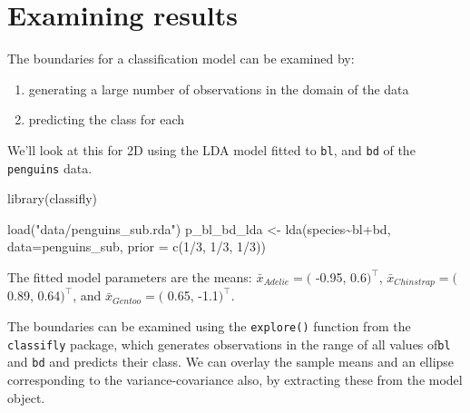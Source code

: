 \documentclass[
  letterpaper,
]{book}
\newenvironment{Shaded}{\begin{snugshade}}{\end{snugshade}}
\newcommand{\AttributeTok}[1]{\textcolor[rgb]{0.40,0.45,0.13}{#1}}
\newcommand{\DecValTok}[1]{\textcolor[rgb]{0.68,0.00,0.00}{#1}}
\newcommand{\FunctionTok}[1]{\textcolor[rgb]{0.28,0.35,0.67}{#1}}
\newcommand{\NormalTok}[1]{\textcolor[rgb]{0.00,0.23,0.31}{#1}}
\newcommand{\OtherTok}[1]{\textcolor[rgb]{0.00,0.23,0.31}{#1}}
\newcommand{\SpecialCharTok}[1]{\textcolor[rgb]{0.37,0.37,0.37}{#1}}
\newcommand{\StringTok}[1]{\textcolor[rgb]{0.13,0.47,0.30}{#1}}
\providecommand{\tightlist}{%
  \setlength{\itemsep}{0pt}\setlength{\parskip}{0pt}}\usepackage{longtable,booktabs,array}
\begin{document}
\hypertarget{examining-results}{%
\section{Examining results}\label{examining-results}}

The boundaries for a classification model can be examined by:

\begin{enumerate}
\def\labelenumi{\arabic{enumi}.}
\tightlist
\item
  generating a large number of observations in the domain of the data
\item
  predicting the class for each
\end{enumerate}

We'll look at this for 2D using the LDA model fitted to \texttt{bl}, and
\texttt{bd} of the \texttt{penguins} data.

\begin{Shaded}
\begin{Highlighting}[]
\FunctionTok{library}\NormalTok{(classifly)}

\FunctionTok{load}\NormalTok{(}\StringTok{"data/penguins\_sub.rda"}\NormalTok{)}
\NormalTok{p\_bl\_bd\_lda }\OtherTok{\textless{}{-}} \FunctionTok{lda}\NormalTok{(species}\SpecialCharTok{\textasciitilde{}}\NormalTok{bl}\SpecialCharTok{+}\NormalTok{bd, }\AttributeTok{data=}\NormalTok{penguins\_sub, }
                                  \AttributeTok{prior =} \FunctionTok{c}\NormalTok{(}\DecValTok{1}\SpecialCharTok{/}\DecValTok{3}\NormalTok{, }\DecValTok{1}\SpecialCharTok{/}\DecValTok{3}\NormalTok{, }\DecValTok{1}\SpecialCharTok{/}\DecValTok{3}\NormalTok{))}
\end{Highlighting}
\end{Shaded}

The fitted model parameters are the means: \(\bar{x}_{Adelie} = (\)
-0.95, 0.6\()^\top\), \(\bar{x}_{Chinstrap} = (\) 0.89, 0.64\()^\top\),
and \(\bar{x}_{Gentoo} = (\) 0.65, -1.1\()^\top\).

The boundaries can be examined using the \texttt{explore()} function
from the \texttt{classifly} package, which generates observations in the
range of all values of\texttt{bl} and \texttt{bd} and predicts their
class. We can overlay the sample means and an ellipse corresponding to
the variance-covariance also, by extracting these from the model object.
\end{document}
